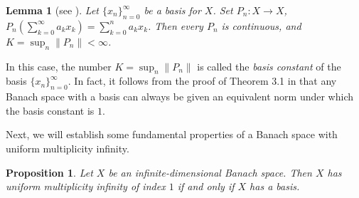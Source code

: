 \documentclass[12pt]{amsart}
\numberwithin{equation}{section}
\theoremstyle{plain}
\newtheorem{prop}[thm]{Proposition}
\newtheorem{lem}[thm]{Lemma}
\theoremstyle{definition}
\begin{document}
\begin{lem}[see {\cite[Theorem 3.1]{CNL2005}}]
Let $\{x_n\}_{n=0}^{\infty}$ be a basis for $X$.
Set $P_n: X\rightarrow X$,
$P_n(\sum_{k=0}^{\infty}a_k x_k)=\sum_{k=0}^{n}a_k x_k$.
Then every $P_n$ is continuous, and $K=\sup_n\|P_n\|<\infty$.
\end{lem}
In this case, the number $K=\sup_n\|P_n\|$ is called the {\em basis constant} of the basis $\{x_n\}_{n=0}^{\infty}$.
In fact, it follows from the proof of
Theorem 3.1 in \cite{CNL2005} that any Banach space with a basis can always be given an equivalent norm under which the basis constant is $1$.

Next, we will establish some fundamental properties of a Banach space with uniform multiplicity infinity.

\begin{prop}\label{B:uniP1}
Let $X$ be an infinite-dimensional Banach space.
Then $X$ has uniform multiplicity infinity of index $1$ if and only if $X$ has a basis.
\end{prop}
\end{document}
